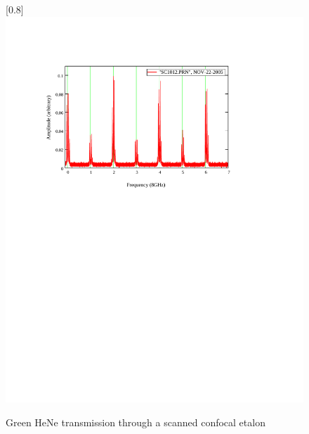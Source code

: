\begin{figure}
\scalebox{0.8}[0.8]{
\includegraphics[bb=15 440 489 752]
{confocal_all/confocal_all.pdf}
}
\caption[Green HeNe transmission through a scaned confocal etalon]{Green HeNe transmission through a scanned confocal etalon}
\label{confocal_all}
\end{figure}
